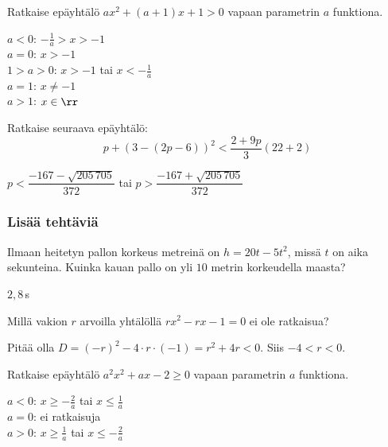 \begin{tehtavasivu}
\begin{tehtava}
    Ratkaise epäyhtälö $ax^2+(a+1)x+1 > 0$ vapaan parametrin $a$ funktiona.
    \begin{vastaus}
        $a < 0$: $-\frac{1}{a} > x > -1$ \\ $a = 0$: $x > -1$ \\ $1 > a > 0$: $x > -1$ tai $x < -\frac{1}{a}$ \\ $a = 1$: $x \neq -1$ \\ $a > 1$: $x \in \rr$
    \end{vastaus}
\end{tehtava}


\begin{tehtava}
    Ratkaise seuraava epäyhtälö:
    $$p+(3-(2p-6))^2<\dfrac{2+9p}{3}(22+2)$$
    \begin{vastaus}
        $p<\dfrac{-167-\sqrt{205\,705}}{372}$ tai $p>\dfrac{-167+\sqrt{205\,705}}{372}$
    \end{vastaus}
\end{tehtava}

\subsubsection*{Lisää tehtäviä}

\begin{tehtava}
Ilmaan heitetyn pallon korkeus metreinä on $h=20t-5t^2$, missä $t$ on aika sekunteina. Kuinka kauan pallo on yli $10$ metrin korkeudella maasta?
    \begin{vastaus}
	$2,8$\,s
    \end{vastaus}
\end{tehtava}

\begin{tehtava}
	Millä vakion $r$ arvoilla yhtälöllä $rx^2-rx-1 = 0$ ei ole ratkaisua?
	\begin{vastaus}
		Pitää olla $D=(-r)^2-4 \cdot r \cdot (-1)=r^2+4r<0$. Siis $-4 < r < 0$.
	\end{vastaus}
\end{tehtava}

\begin{tehtava}
    Ratkaise epäyhtälö $a^2x^2+ax-2 \geq 0$ vapaan parametrin $a$ funktiona.
    \begin{vastaus}
        $a < 0$: $x \geq -\frac{2}{a}$ tai $x \leq \frac{1}{a}$ \\ $a = 0$: ei ratkaisuja \\ $a > 0$: $x \geq \frac{1}{a}$ tai $x \leq -\frac{2}{a}$
    \end{vastaus}
\end{tehtava}

\end{tehtavasivu}